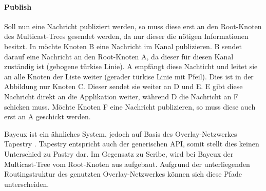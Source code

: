 \paragraph{Publish}
Soll nun eine Nachricht publiziert werden, so muss diese erst an den Root-Knoten des Multicast-Trees gesendet werden, da nur dieser die nötigen Informationen besitzt. In  möchte Knoten B eine Nachricht im Kanal publizieren. B sendet darauf eine Nachricht an den Root-Knoten A, da dieser für diesen Kanal zuständig ist (gebogene türkise Linie). A empfängt diese Nachticht und leitet sie an alle Knoten der Liste weiter (gerader türkise Linie mit Pfeil). Dies ist in der Abbildung nur Knoten C. Dieser sendet sie weiter an D und E. E gibt diese Nachricht direkt an die Applikation weiter, während D die Nachricht an F schicken muss. Möchte Knoten F eine Nachricht publizieren, so muss diese auch erst an A geschickt werden.

Bayeux \cite{Zhuang2001} ist ein ähnliches System, jedoch auf Basis des Overlay-Netzwerkes Tapestry \cite{Zhao2004Tapestry}. Tapestry entspricht auch der generischen API, somit stellt dies keinen Unterschied zu Pastry dar. Im Gegensatz zu Scribe, wird bei Bayeux der Multicast-Tree vom Root-Knoten aus aufgebaut. Aufgrund der unterliegenden Routingstruktur des genutzten Overlay-Netzwerkes können sich diese Pfade unterscheiden.
